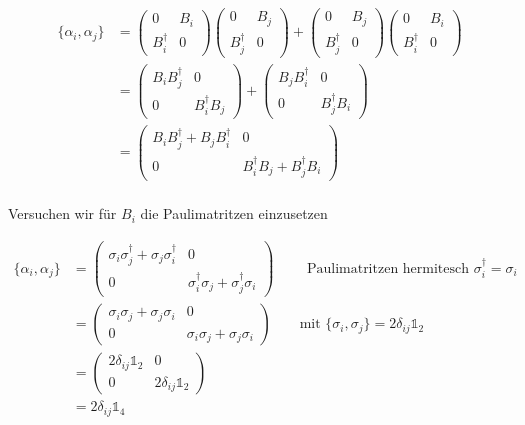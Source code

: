 \begin{align}
  \label{eq:18}
  \{\alpha_i,\alpha_j\}&=\begin{pmatrix}0&B_i\\ B^\dagger_i&0\end{pmatrix}\begin{pmatrix}0&B_j\\ B^\dagger_j&0\end{pmatrix} + \begin{pmatrix}0&B_j\\ B^\dagger_j&0\end{pmatrix}\begin{pmatrix}0&B_i\\ B^\dagger_i&0\end{pmatrix}\\
&=  \begin{pmatrix}B_iB_j^\dagger&0\\ 0&B^\dagger_iB_j\end{pmatrix}+\begin{pmatrix}B_j B_i^\dagger &0\\ 0&B^\dagger_j B_i\end{pmatrix}   \\  
&=  \begin{pmatrix}B_iB_j^\dagger +B_j B_i^\dagger &0\\ 0&B^\dagger_iB_j+B^\dagger_j B_i\end{pmatrix}\\
\end{align}

Versuchen wir für \(B_i\) die Paulimatritzen einzusetzen


\begin{align}
  \label{eq:19}
  \{\alpha_i,\alpha_j\} &= \begin{pmatrix}\sigma_i\sigma_j^\dagger +\sigma_j \sigma_i^\dagger &0\\ 0&\sigma^\dagger_i\sigma_j+\sigma^\dagger_j \sigma_i\end{pmatrix} \qquad \text{ Paulimatritzen hermitesch } \sigma_i^\dagger = \sigma_i \\
&= \begin{pmatrix}\sigma_i\sigma_j +\sigma_j \sigma_i &0\\ 0&\sigma_i\sigma_j+\sigma_j \sigma_i\end{pmatrix} \qquad \text{mit } \{\sigma_i,\sigma_j\}=2\delta_{ij}\mathds 1_2 \\ 
&=  \begin{pmatrix}2\delta_{ij}\mathds 1_2 &0\\ 0&2\delta_{ij}\mathds 1_2 \end{pmatrix}\\
&=2\delta_{ij}\mathds 1_4
\end{align}

